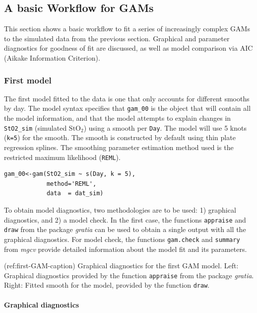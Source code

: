 \documentclass[Royal,times,sagev]{sagej}
\begin{document}
\hypertarget{workflow}{%
\subsection{A basic Workflow for GAMs}\label{workflow}}

This section shows a basic workflow to fit a series of increasingly
complex GAMs to the simulated data from the previous section. Graphical
and parameter diagnostics for goodness of fit are discussed, as well as
model comparison via AIC (Aikake Information Criterion).

\hypertarget{first-model}{%
\subsubsection{First model}\label{first-model}}

The first model fitted to the data is one that only accounts for
different smooths by day. The model syntax specifies that
\texttt{gam\_00} is the object that will contain all the model
information, and that the model attempts to explain changes in
\texttt{StO2\_sim} (simulated \(\mbox{StO}_2\)) using a smooth per
\texttt{Day}. The model will use 5 knots (\texttt{k=5}) for the smooth.
The smooth is constructed by default using thin plate regression
splines. The smoothing parameter estimation method used is the
restricted maximum likelihood (\texttt{REML}).

\begin{verbatim}
gam_00<-gam(StO2_sim ~ s(Day, k = 5),
            method='REML',
            data  = dat_sim)
\end{verbatim}

To obtain model diagnostics, two methodologies are to be used: 1)
graphical diagnostics, and 2) a model check. In the first case, the
functions \texttt{appraise} and \texttt{draw} from the package
\emph{gratia} can be used to obtain a single output with all the
graphical diagnostics. For model check, the functions \texttt{gam.check}
and \texttt{summary} from \emph{mgcv} provide detailed information about
the model fit and its parameters.

(ref:first-GAM-caption) Graphical diagnostics for the first GAM model.
Left: Graphical diagnostics provided by the function \texttt{appraise}
from the package \emph{gratia}. Right: Fitted smooth for the model,
provided by the function \texttt{draw}.

\hypertarget{graphical-diagnostics}{%
\paragraph{Graphical diagnostics}\label{graphical-diagnostics}}
\end{document}
